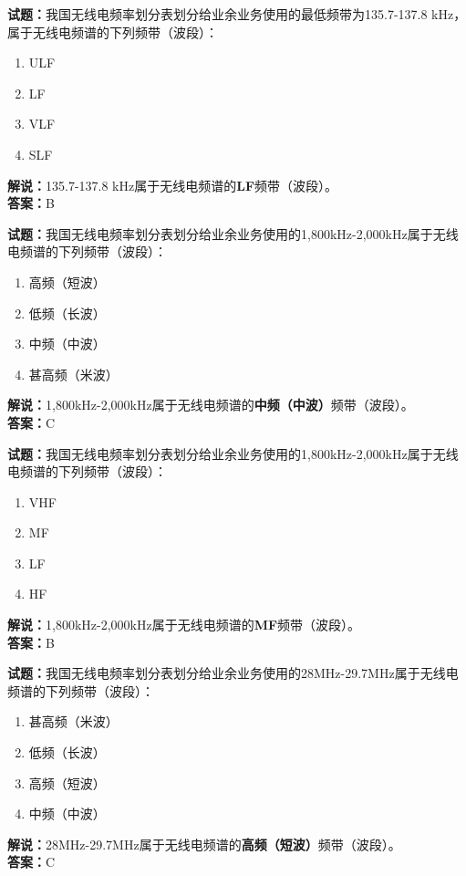 \documentclass{ctexbook}
\begin{document}
\bigskip


\noindent\textbf{试题：}我国无线电频率划分表划分给业余业务使用的最低频带为135.7-137.8 kHz，属于无线电频谱的下列频带（波段）：
\begin{enumerate}[leftmargin=3em]
\item ULF
\item LF
\item VLF
\item SLF
\end{enumerate}
\noindent\textbf{解说：}135.7-137.8 kHz属于无线电频谱的\textbf{LF}频带（波段）。\\\noindent\textbf{答案：}B




\bigskip


\noindent\textbf{试题：}我国无线电频率划分表划分给业余业务使用的1,800kHz-2,000kHz属于无线电频谱的下列频带（波段）：
\begin{enumerate}[leftmargin=3em]
\item 高频（短波）
\item 低频（长波）
\item 中频（中波）
\item 甚高频（米波）
\end{enumerate}
\noindent\textbf{解说：}1,800kHz-2,000kHz属于无线电频谱的\textbf{中频（中波）}频带（波段）。\\\noindent\textbf{答案：}C




\bigskip


\noindent\textbf{试题：}我国无线电频率划分表划分给业余业务使用的1,800kHz-2,000kHz属于无线电频谱的下列频带（波段）：
\begin{enumerate}[leftmargin=3em]
\item VHF
\item MF
\item LF
\item HF
\end{enumerate}
\noindent\textbf{解说：}1,800kHz-2,000kHz属于无线电频谱的\textbf{MF}频带（波段）。\\\noindent\textbf{答案：}B



\bigskip


\noindent\textbf{试题：}我国无线电频率划分表划分给业余业务使用的28MHz-29.7MHz属于无线电频谱的下列频带（波段）：
\begin{enumerate}[leftmargin=3em]
\item 甚高频（米波）
\item 低频（长波）
\item 高频（短波）
\item 中频（中波）
\end{enumerate}
\noindent\textbf{解说：}28MHz-29.7MHz属于无线电频谱的\textbf{高频（短波）}频带（波段）。\\\noindent\textbf{答案：}C
\end{document}
